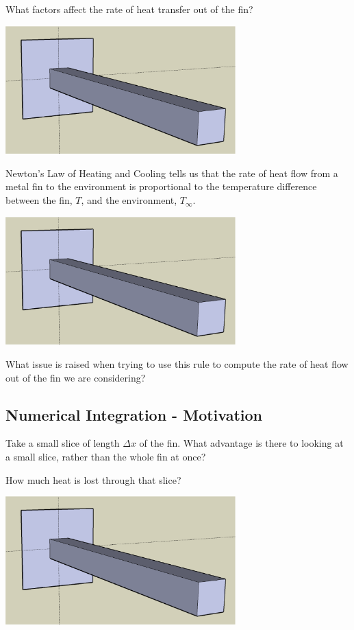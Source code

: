 \newpage

\problem What factors affect the rate of heat transfer out of the
  fin?

\begin{center}
\includegraphics[width=3.5in]{graphics/notes_06_LongPin3D}
\end{center}

\vfill
\vfill

\newpage

Newton's Law of Heating and Cooling tells us that the rate of heat
flow from a metal fin to the environment is proportional to the
temperature difference between the fin, $T$, and the environment,
$T_\infty$.
\begin{center}
\includegraphics[width=3.5in]{graphics/notes_06_LongPin3D}
\end{center}

\problem What issue is raised when trying to use this rule to compute
the rate of heat flow out of the fin we are considering?
 

\newpage
{}
\subsection*{Numerical Integration - Motivation}

\problem Take a small slice of length $\Delta x$ of the fin.  What
advantage is there to looking at a small slice, rather than the whole
fin at once?
\vfill

How much heat is lost through that slice?
\begin{center}
\includegraphics[width=3.5in]{graphics/notes_06_LongPin3D}
\end{center}

